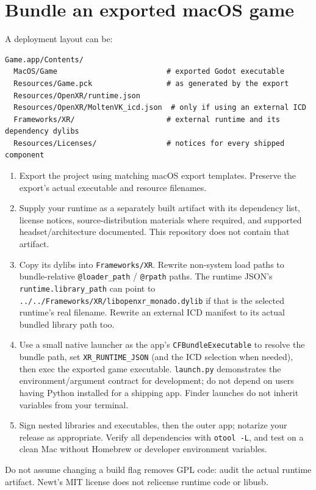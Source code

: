 \documentclass[11pt]{article}
\begin{document}
\section{Bundle an exported macOS game}
\label{sec:orge99d38e}
A deployment layout can be:
\begin{verbatim}
Game.app/Contents/
  MacOS/Game                         # exported Godot executable
  Resources/Game.pck                 # as generated by the export
  Resources/OpenXR/runtime.json
  Resources/OpenXR/MoltenVK_icd.json  # only if using an external ICD
  Frameworks/XR/                     # external runtime and its dependency dylibs
  Resources/Licenses/                # notices for every shipped component
\end{verbatim}
\begin{enumerate}
\item Export the project using matching macOS export templates. Preserve the export's actual executable and resource filenames.
\item Supply your runtime as a separately built artifact with its dependency list, license notices, source-distribution materials where required, and supported headset/architecture documented. This repository does not contain that artifact.
\item Copy its dylibs into \texttt{Frameworks/XR}. Rewrite non-system load paths to bundle-relative \texttt{@loader\_path} / \texttt{@rpath} paths. The runtime JSON's \texttt{runtime.library\_path} can point to \texttt{../../Frameworks/XR/libopenxr\_monado.dylib} if that is the selected runtime's real filename. Rewrite an external ICD manifest to its actual bundled library path too.
\item Use a small native launcher as the app's \texttt{CFBundleExecutable} to resolve the bundle path, set \texttt{XR\_RUNTIME\_JSON} (and the ICD selection when needed), then exec the exported game executable. \texttt{launch.py} demonstrates the environment/argument contract for development; do not depend on users having Python installed for a shipping app. Finder launches do not inherit variables from your terminal.
\item Sign nested libraries and executables, then the outer app; notarize your release as appropriate. Verify all dependencies with \texttt{otool -L}, and test on a clean Mac without Homebrew or developer environment variables.
\end{enumerate}

Do not assume changing a build flag removes GPL code: audit the actual runtime artifact. Newt's MIT license does not relicense runtime code or libusb.
\end{document}
